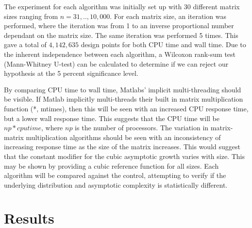 \documentclass[sigconf]{acmart}
\begin{document}
The experiment for each algorithm was initially set up with 30 different matrix sizes ranging from $n=31,..,10,000$. For each matrix size, an iteration was performed, where the iteration was from 1 to an inverse proportional number dependant on the matrix size. The same iteration was performed 5 times. This gave a total of $4,142,635$ design points for both CPU time and wall time. Due to the inherent independence between each algorithm, a Wilcoxon rank-sum test (Mann-Whitney U-test) can be calculated to determine if we can reject our hypothesis at the 5 percent significance level.

By comparing CPU time to wall time, Matlabs' implicit multi-threading should be visible. If Matlab implicitly multi-threads their built in matrix multiplication function (*, mtimes), then this will be seen with an increased CPU response time, but a lower wall response time. This suggests that the CPU time will be $np*cputime$, where $np$ is the number of processors. The variation in matrix-matrix multiplication algorithms should be seen with an inconsistency of increasing response time as the size of the matrix increases. This would suggest that the constant modifier for the cubic asymptotic growth varies with size. This may be shown by providing a cubic reference function for all sizes. Each algorithm will be compared against the control, attempting to verify if the underlying distribution and asymptotic complexity is statistically different. 

\section{Results}

\end{document}
